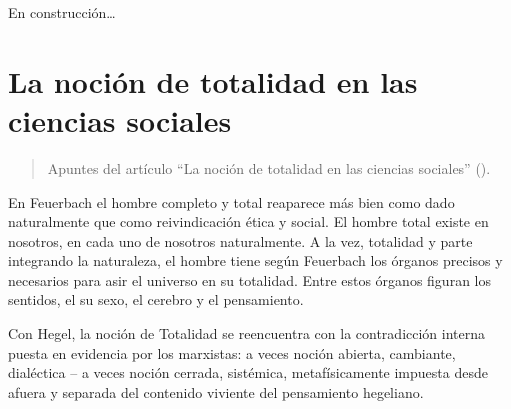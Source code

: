 \documentclass[
  letterpaper,
  DIV=11,
  numbers=noendperiod]{scrreprt}
\begin{document}
En construcción\ldots{}

\chapter{La noción de totalidad en las ciencias
sociales}\label{la-nociuxf3n-de-totalidad-en-las-ciencias-sociales}

\begin{quote}
Apuntes del artículo ``La noción de totalidad en las ciencias sociales''
().
\end{quote}

En Feuerbach el hombre completo y total reaparece más bien como dado
naturalmente que como reivindicación ética y social. El hombre total
existe en nosotros, en cada uno de nosotros naturalmente. A la vez,
totalidad y parte integrando la naturaleza, el hombre tiene según
Feuerbach los órganos precisos y necesarios para asir el universo en su
totalidad. Entre estos órganos figuran los sentidos, el su sexo, el
cerebro y el pensamiento.

Con Hegel, la noción de Totalidad se reencuentra con la contradicción
interna puesta en evidencia por los marxistas: a veces noción abierta,
cambiante, dialéctica -- a veces noción cerrada, sistémica,
metafísicamente impuesta desde afuera y separada del contenido viviente
del pensamiento hegeliano.
\end{document}
